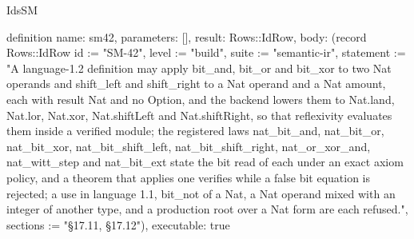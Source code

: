\begin{lexlean}{IdsSM}
\begin{semanticmodule}
definition{
  name: sm42,
  parameters: [],
  result: Rows::IdRow,
  body: (record Rows::IdRow {id := "SM-42", level := "build", suite := "semantic-ir", statement := "A language-1.2 definition may apply bit_and, bit_or and bit_xor to two Nat operands and shift_left and shift_right to a Nat operand and a Nat amount, each with result Nat and no Option, and the backend lowers them to Nat.land, Nat.lor, Nat.xor, Nat.shiftLeft and Nat.shiftRight, so that reflexivity evaluates them inside a verified module; the registered laws nat_bit_and, nat_bit_or, nat_bit_xor, nat_bit_shift_left, nat_bit_shift_right, nat_or_xor_and, nat_witt_step and nat_bit_ext state the bit read of each under an exact axiom policy, and a theorem that applies one verifies while a false bit equation is rejected; a use in language 1.1, bit_not of a Nat, a Nat operand mixed with an integer of another type, and a production root over a Nat form are each refused.", sections := "§17.11, §17.12"}),
  executable: true
}
\end{semanticmodule}
\end{lexlean}
